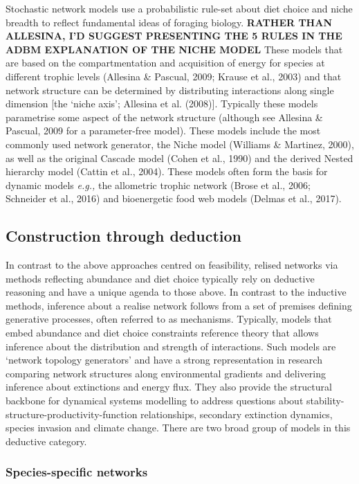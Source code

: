 \documentclass[
]{article}
\begin{document}
Stochastic network models use a probabilistic rule-set about diet choice
and niche breadth to reflect fundamental ideas of foraging biology.
\textbf{RATHER THAN ALLESINA, I'D SUGGEST PRESENTING THE 5 RULES IN THE
ADBM EXPLANATION OF THE NICHE MODEL} These models that are based on the
compartmentation and acquisition of energy for species at different
trophic levels (Allesina \& Pascual, 2009; Krause et al., 2003) and that
network structure can be determined by distributing interactions along
single dimension {[}the `niche axis'; Allesina et al. (2008){]}.
Typically these models parametrise some aspect of the network structure
(although see Allesina \& Pascual, 2009 for a parameter-free model).
These models include the most commonly used network generator, the Niche
model (Williams \& Martinez, 2000), as well as the original Cascade
model (Cohen et al., 1990) and the derived Nested hierarchy model
(Cattin et al., 2004). These models often form the basis for dynamic
models \emph{e.g.,} the allometric trophic network (Brose et al., 2006;
Schneider et al., 2016) and bioenergetic food web models (Delmas et al.,
2017).

\subsection{Construction through
deduction}\label{construction-through-deduction}

In contrast to the above approaches centred on feasibility, relised
networks via methods reflecting abundance and diet choice typically rely
on deductive reasoning and have a unique agenda to those above. In
contrast to the inductive methods, inference about a realise network
follows from a set of premises defining generative processes, often
referred to as mechanisms. Typically, models that embed abundance and
diet choice constraints reference theory that allows inference about the
distribution and strength of interactions. Such models are `network
topology generators' and have a strong representation in research
comparing network structures along environmental gradients and
delivering inference about extinctions and energy flux. They also
provide the structural backbone for dynamical systems modelling to
address questions about stability-structure-productivity-function
relationships, secondary extinction dynamics, species invasion and
climate change. There are two broad group of models in this deductive
category.

\subsubsection{Species-specific
networks}\label{species-specific-networks}
\end{document}
